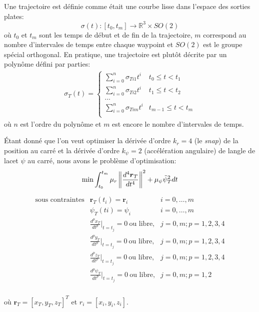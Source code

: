 Une trajectoire est définie comme était une courbe lisse dans l'espace des sorties plates:
$$ \sigma(t) : [t_0, t_m] \rightarrow \mathbb{R}^3 \times SO(2)$$
où $t_0$ et $t_m$ sont les temps de début et de fin de la trajectoire, $m$ correspond au nombre d'intervales de temps entre chaque waypoint et $SO(2)$ est le groupe spécial orthogonal. En pratique, une trajectoire est plutôt décrite par un polynôme défini par parties:
\begin{align}\label{eq:polynomial}
\sigma_T(t) =
\left\{
	\begin{array}{ll}
		\sum_{i=0}^n \sigma_{Ti1} t^i  & t_0 \leq t < t_1 \\
		\sum_{i=0}^n \sigma_{Ti2} t^i  & t_1 \leq t < t_2 \\
		... \\
		\sum_{i=0}^n \sigma_{Tim} t^i  & t_{m-1} \leq t < t_m \\
	\end{array}
\right.
\end{align}
où $n$ est l'ordre du polynôme et $m$ est encore le nombre d'intervales de temps.

Étant donné que l'on veut optimiser la dérivée d'ordre $k_r = 4$ (le \textit{snap}) de la position au carré et la dérivée d'ordre $k_\psi = 2$ (accélération angulaire) de langle de lacet $\psi$ au carré, nous avons le problème d'optimisation:
\begin{align}\label{eq:opt}
\text{min} \int_{t_0}^{t_m} \mu_r \left\lVert\frac{d^4 \boldsymbol{r}_T}{dt^4}\right\rVert^2 + \mu_\psi {\ddot{\psi}_T}^2 dt
\end{align}\begin{align*}
	\begin{array}{lll}
		\text{sous contraintes} & \boldsymbol{r}_T(t_i) = \boldsymbol{r}_i & i = 0, \ldots, m\\
		& \psi_T(ti)=\psi_i & i = 0, \ldots, m\\
		& \frac{d^p x_T}{dt^p}|_{t=t_j} = 0\ \text{ou libre,} & j = 0, m; p = 1, 2, 3, 4\\
		& \frac{d^p y_T}{dt^p}|_{t=t_j} = 0\ \text{ou libre,} & j = 0, m; p = 1, 2, 3, 4\\
		& \frac{d^p z_T}{dt^p}|_{t=t_j} = 0\ \text{ou libre,} & j = 0, m; p = 1, 2, 3, 4\\
		& \frac{d^p \psi_T}{dt^p}|_{t=t_j} = 0\ \text{ou libre,} & j = 0, m; p = 1, 2\\
	\end{array}
\end{align*}

où $\boldsymbol{r}_T = [x_T, y_T, z_T]^T$ et $r_i = [x_i, y_i, z_i]$.
